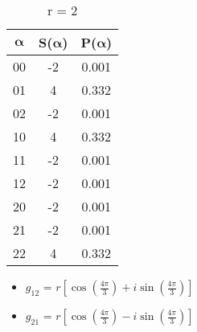 \begin{table}[h]
\begin{subtable}{.3\textwidth}
        \centering
        \caption{r = 2}
        \begin{tabular}{ccc}
            \toprule
             $\boldsymbol{\alpha}$ & S($\boldsymbol{\alpha}$) & P($\boldsymbol{\alpha}$)\\
            \midrule
            00 & -2 & 0.001 \\
            01 & 4 & 0.332 \\
            02 & -2 & 0.001 \\
            10 & 4 & 0.332 \\
            11 & -2 & 0.001 \\
            12 & -2 & 0.001 \\
            20 & -2 & 0.001 \\
            21 & -2 & 0.001 \\
            22 & 4 & 0.332 \\
          \bottomrule
        \end{tabular}
    \end{subtable}
\end{table}


\begin{itemize}
    \item $g_{12}$ = $r\left[\cos\left( \frac{4\pi}{3}\right) + i \sin\left( \frac{4\pi}{3}\right)\right]$
    \item $g_{21}$ = $r\left[\cos\left( \frac{4\pi}{3}\right) - i \sin\left( \frac{4\pi}{3}\right)\right]$
\end{itemize}

